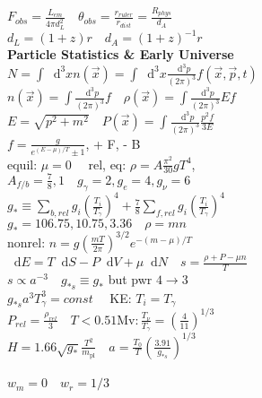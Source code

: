 \documentclass[12pt]{article}
\newcommand*\diff{\mathop{}\!\mathrm{d}}
\newcommand{\stint}{\int\frac{\diff^3 p}{(2\pi)^3}}
\begin{document}
{	\\$F_{obs}=\frac{L_{em}}{4\pi d_L^2} \quad \theta_{obs}=\frac{r_{ruler}}{r_{dist}}=\frac{R_{phys}}{d_A}$
	\\$d_L=(1+z)r \quad d_A=(1+z)^{-1}r$
	\\\textbf{Particle Statistics \& Early Universe}
	\\$N=\int\diff^3x n(\vec{x})=\int\diff^3x\frac{\diff^3p}{(2\pi)^3}f(\vec{x},\vec{p},t)$
	\\$n(\vec{x})=\int\frac{\diff^3 p}{(2\pi)^3}f \quad \rho(\vec{x})=\stint E f$
	\\$E=\sqrt{p^2+m^2} \quad P(\vec{x})=\stint \frac{p^2f}{3E}$
	\\$f=\frac{g}{e^{(E-\mu)/T}\pm 1}$, + F, - B
	\\equil: $\mu=0 \quad $ rel, eq: $\rho= A\frac{\pi^2}{30}gT^4$, 
	\\$A_{f/b}=\frac{7}{8},1 \quad g_\gamma=2, g_e=4, g_\nu=6$
	\\$g_*\equiv\sum\limits_{b, rel}g_i\left(\frac{T_i}{T_\gamma}\right)^4+\frac{7}{8}\sum\limits_{f, rel}g_i\left(\frac{T_i}{T_\gamma}\right)^4$
	\\$g_*=106.75, 10.75, 3.36 \quad \rho=mn$
	\\nonrel: $n=g\left(\frac{mT}{2\pi}\right)^{3/2}e^{-(m-\mu)/T}$
	\\$\diff E =T\diff S - P\diff V + \mu \diff N \quad s=\frac{\rho+P-\mu n}{T}$
	\\$s\propto a^{-3} \quad g_{*s}\equiv g_*$ but pwr $4\rightarrow 3$
	\\$g_{*s}a^3T_\gamma^3=const \quad $ KE: $T_i=T_\gamma$
	\\$P_{rel}=\frac{\rho_{rel}}{3} \quad T < 0.51\text{Mv}: \frac{T_\nu}{T_\gamma}=\left(\frac{4}{11}\right)^{1/3}$
	\\$H=1.66\sqrt{g_*}\frac{T^2}{m_\text{pl}} \quad a=\frac{T_0}{T}\left(\frac{3.91}{g_{*s}}\right)^{1/3}$
	\\
	\\$w_m=0 \quad w_r=1/3$
}
\end{document}
